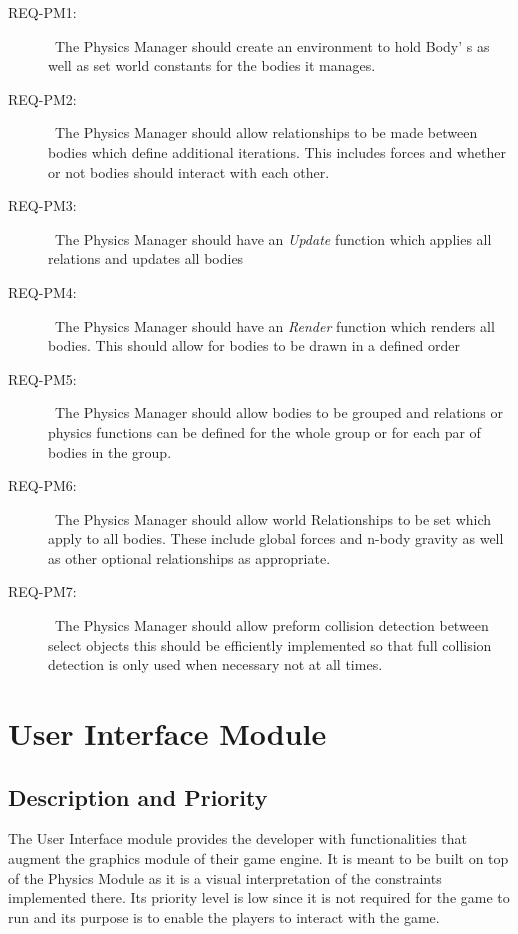 \documentclass{scrreprt}
\begin{document}
\begin{description}
\item [{REQ-PM1:}]~The Physics Manager should create an environment to hold Body' s as well as set world constants for the bodies it manages.
\item [{REQ-PM2:}]~The Physics Manager should allow relationships to be made between bodies which define additional iterations.  This includes forces and whether or not bodies should interact with each other.
\item [{REQ-PM3:}]~The Physics Manager should have an \textit{Update} function which applies all relations and updates all bodies
\item [{REQ-PM4:}]~The Physics Manager should have an \textit{Render} function which renders all bodies.  This should allow for bodies to be drawn in a defined order
\item [{REQ-PM5:}]~The Physics Manager should allow bodies to be grouped and relations or physics functions can be defined for the whole group or for each par of bodies in the group.
\item [{REQ-PM6:}]~The Physics Manager should allow world Relationships to be set which apply to all bodies.  These include global forces and n-body gravity as well as other optional relationships as appropriate.
\item [{REQ-PM7:}]~The Physics Manager should allow preform collision detection between select objects  this should be efficiently implemented so that full collision detection is only used when necessary not at all times.
\end{description}


\section{User Interface Module}
\subsection{Description and Priority}
The User Interface module provides the developer with functionalities that augment the graphics module of their game engine. It is meant to be built on top of the Physics Module as it is a visual interpretation of the constraints implemented there. Its priority level is low since it is not required for the game to run and its purpose is to enable the players to interact with the game.
\end{document}
